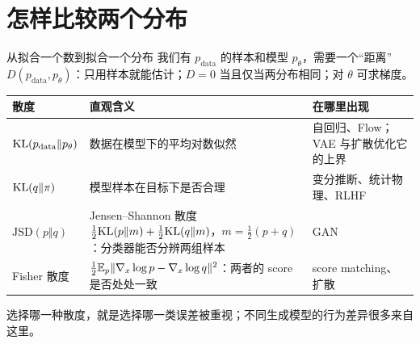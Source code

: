 \documentclass[aspectratio=169,10pt,UTF8,fontset=none]{ctexbeamer}
\begin{document}
\section{怎样比较两个分布}

\begin{frame}{从拟合一个数到拟合一个分布}
  我们有 $p_{\mathrm{data}}$ 的样本和模型 $p_\theta$，需要一个“距离” $D(p_{\mathrm{data}},p_\theta)$：只用样本就能估计；$D=0$ 当且仅当两分布相同；对 $\theta$ 可求梯度。
  \vspace{2mm}

  \small
  \begin{tabularx}{\textwidth}{@{}l X X@{}}
    \toprule
    散度 & 直观含义 & 在哪里出现\\
    \midrule
    $\mathrm{KL}(p_{\mathrm{data}}\Vert p_\theta)$ & 数据在模型下的平均对数似然 & 自回归、Flow；VAE 与扩散优化它的上界\\
    $\mathrm{KL}(q\Vert\pi)$ & 模型样本在目标下是否合理 & 变分推断、统计物理、RLHF\\
    $\mathrm{JSD}(p\Vert q)$ & Jensen--Shannon 散度 $\tfrac12\mathrm{KL}(p\Vert m)+\tfrac12\mathrm{KL}(q\Vert m)$，$m=\tfrac12(p+q)$：分类器能否分辨两组样本 & GAN\\
    Fisher 散度 & $\tfrac12\mathbb{E}_p\|\nabla_x\log p-\nabla_x\log q\|^2$：两者的 score 是否处处一致 & score matching、扩散\\
    \bottomrule
  \end{tabularx}
  \vspace{3mm}
  \begin{takeaway}
    选择哪一种散度，就是选择哪一类误差被重视；不同生成模型的行为差异很多来自这里。
  \end{takeaway}
\end{frame}
\end{document}
